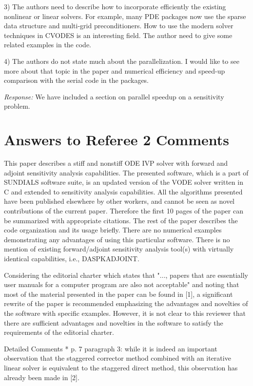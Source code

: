 3) The authors need to describe how to incorporate efficiently the existing 
nonlinear or linear solvers. For example, many PDE packages now use the sparse 
data structure and multi-grid preconditioners. How to use the modern solver
techniques  in CVODES is an interesting field. The author need
to give some related examples in the code. 

4) The authors do not state much about the parallelization. I would like to 
see more about that topic in the paper and numerical efficiency and speed-up
comparison with the serial code in the packages.

{\em Response:}
We have included a section on parallel speedup on a sensitivity problem.


\newpage
\section{Answers to Referee 2 Comments}

This paper describes a stiff and nonstiff ODE IVP solver with forward and adjoint sensitivity
analysis capabilities. The presented software, which is a part of SUNDIALS software suite, is an
updated version of the VODE solver written in C and extended to sensitivity analysis capabilities.
All the algorithms presented have been published elsewhere by other workers, and cannot be seen
as novel contributions of the current paper. Therefore the first 10 pages of the paper can be
summarized with appropriate citations. The rest of the paper describes the code organization and
its usage briefly. There are no numerical examples demonstrating any advantages of using this
particular software. There is no mention of existing forward/adjoint sensitivity analysis tool(s)
with virtually identical capabilities, i.e., DASPKADJOINT.

Considering the editorial charter which states that "..., papers that are essentially user manuals
for a computer program are also not acceptable" and noting that most of the material presented
in the paper can be found in [1], a significant rewrite of the paper is recommended emphasizing
the advantages and novelties of the software with specific examples. However, it is not clear to this
reviewer that there are sufficient advantages and novelties in the software to satisfy the requirements
of the editorial charter.

Detailed Comments
* p. 7 paragraph 3: while it is indeed an important observation that the staggered corrector
method combined with an iterative linear solver is equivalent to the staggered direct method,
this observation has already been made in [2].

